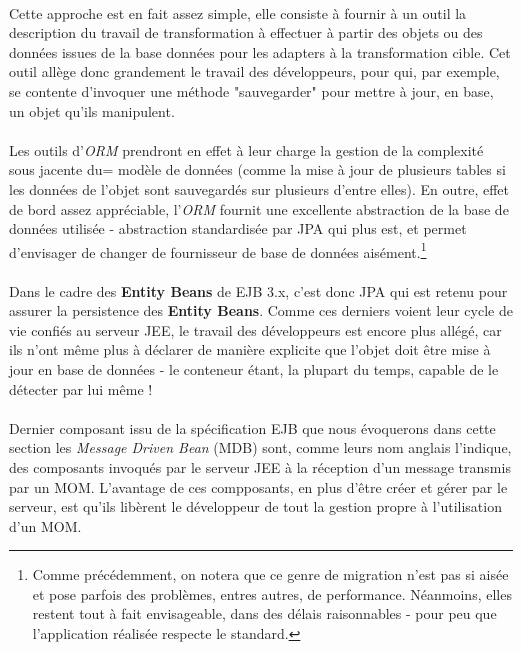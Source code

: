 {  \paragraph{} Cette approche est en fait assez simple, elle consiste à fournir à un outil la
  description du travail de transformation à effectuer à partir des objets ou des données issues de
  la base données pour les adapters à la transformation cible. Cet outil allège donc grandement le
  travail des développeurs, pour qui, par exemple, se contente d'invoquer une méthode "sauvegarder"
  pour mettre à jour, en base, un objet qu'ils manipulent.

  \paragraph{} Les outils d'\textit{ORM} prendront en effet à leur charge la gestion de la complexité
  sous jacente du= modèle de données (comme la mise à jour de plusieurs tables si les données de l'objet
  sont sauvegardés sur plusieurs d'entre elles). En outre, effet de bord assez appréciable,
  l'\textit{ORM} fournit une excellente abstraction de la base de données utilisée - abstraction
  standardisée par JPA qui plus est, et permet d'envisager de changer de fournisseur de base de
  données aisément.\footnote{Comme précédemment, on notera que ce genre de migration n'est pas si
  aisée et pose parfois des problèmes, entres autres, de performance. Néanmoins, elles restent tout à
  fait envisageable, dans des délais raisonnables - pour peu que l'application réalisée respecte le
  standard.}

  \paragraph{} Dans le cadre des \textbf{Entity Beans} de EJB 3.x, c'est donc JPA qui est retenu
  pour assurer la persistence des \textbf{Entity Beans}. Comme ces derniers voient leur cycle de vie
  confiés au serveur JEE, le travail des développeurs est encore plus allégé, car ils n'ont même
  plus à déclarer de manière explicite que l'objet doit être mise à jour en base de données - le
  conteneur étant, la plupart du temps, capable de le détecter par lui même !


  \paragraph{} Dernier composant issu de la spécification EJB que nous évoquerons dans cette section
  les \textit{Message Driven Bean} (MDB) sont, comme leurs nom anglais l'indique, des composants
  invoqués par le serveur JEE à la réception d'un message transmis par un MOM. L'avantage de ces
  compposants, en plus d'être créer et gérer par le serveur, est qu'ils libèrent le développeur de
  tout la gestion propre à l'utilisation d'un MOM.

}

